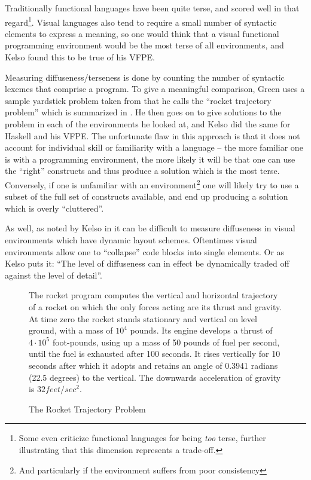 Traditionally functional languages have been quite terse, and scored well in that regard\footnote{Some even criticize functional languages for being \emph{too} terse, further illustrating that this dimension represents a trade-off.}.  Visual languages also tend to require a small number of syntactic elements to express a meaning, so one would think that a visual functional programming environment would be the most terse of all environments, and Kelso found this to be true of his VFPE\cite{Kelso02}.

Measuring diffuseness/terseness is done by counting the number of syntactic lexemes that comprise a program.  To give a meaningful comparison, Green uses a sample yardstick problem taken from \cite{curtis89} that he calls the ``rocket trajectory problem'' which is summarized in .  He then goes on to give solutions to the problem in each of the environments he looked at, and Kelso did the same for Haskell and his VFPE.  The unfortunate flaw in this approach is that it does not account for individual skill or familiarity with a language -- the more familiar one is with a programming environment, the more likely it will be that one can use the ``right'' constructs and thus produce a solution which is the most terse.  Conversely, if one is unfamiliar with an environment\footnote{And particularly if the environment suffers from poor consistency} one will likely try to use a subset of the full set of constructs available, and end up producing a solution which is overly ``cluttered''.

As well, as noted by Kelso in \cite{Kelso02} it can be difficult to measure diffuseness in visual environments which have dynamic layout schemes.  Oftentimes visual environments allow one to ``collapse'' code blocks into single elements.  Or as Kelso puts it: ``The level of diffuseness can in effect be dynamically traded off against the level of detail''.

\begin{figure}
The rocket program computes the vertical and horizontal trajectory of a rocket on which the only forces acting are its thrust and gravity.  At time zero the rocket stands stationary and vertical on level ground, with a mass of $10^4$ pounds.  Its engine develops a thrust of $4\cdot10^5$ foot-pounds, using up a mass of 50 pounds of fuel per second, until the fuel is exhausted after 100 seconds.  It rises vertically for 10 seconds after which it adopts and retains an angle of 0.3941 radians (22.5 degrees) to the vertical.  The downwards acceleration of gravity is $32 feet/sec^2$.\cite{green96}
  \caption{The Rocket Trajectory Problem}
  \label{fig:rocketTrajectoryProblem}
\end{figure}

